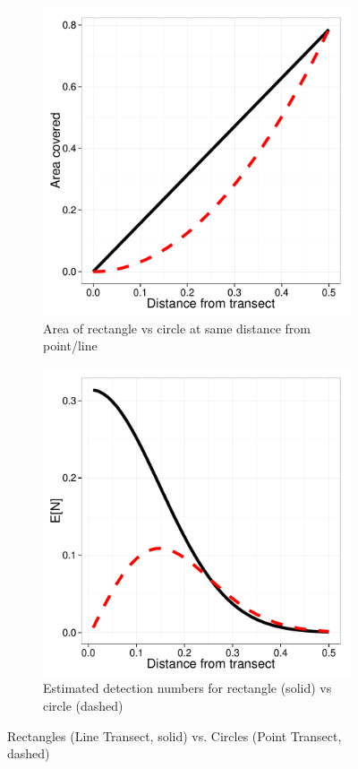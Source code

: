 \documentclass[12pt]{article}
\begin{document}
\begin{figure}
	\centering
	\begin{subfigure}[b]{0.45\textwidth}
		\includegraphics[width=\textwidth]{../images/rect-circ-area.pdf}
		\caption{Area of rectangle vs circle at same distance from point/line}
		\label{fig:perfectArea}
	\end{subfigure}
	\begin{subfigure}[b]{0.45\textwidth}
		\includegraphics[width=\textwidth]{../images/rect-circ-detection.pdf}
		\caption{Estimated detection numbers for rectangle (solid) vs circle (dashed)}
		\label{fig:perfectCount}
	\end{subfigure}
	\caption{Rectangles (Line Transect, solid) vs. Circles (Point Transect, dashed)}
	\label{fig:linevs}
\end{figure}
\end{document}

